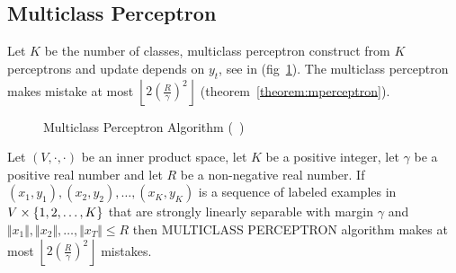 \subsection{Multiclass Perceptron}
Let $K$ be the number of classes, multiclass perceptron construct from $K$ perceptrons
and update depends on $y_t$, see in (fig~\ref{fig:alg-mperceptron}). 
The multiclass perceptron makes mistake at most $\left\lfloor 2\left( \frac{R}{\gamma} \right)^2\right\rfloor$ (theorem~\ref{theorem:mperceptron}).
\begin{figure}[hbt!]
  \begin{algorithm}[H]
    \SetAlgoLined
    \DontPrintSemicolon
  \end{algorithm}
  \caption{Multiclass Perceptron Algorithm (~\cite{CrammerS2003-ultraconservative})}
  \label{fig:alg-mperceptron}
\end{figure}

\begin{theorem}
\label{theorem:mperceptron}
Let $(V,\cdot,\cdot)$ be an inner product space, let $K$ be a
positive integer, let $\gamma$ be a positive real number and let $R$ be a non-negative real number. If $(x_1,y_1),(x_2,y_2),\dots,(x_K,y_K)$
is a sequence of labeled examples in $V\times\{1,2,\dots,K\}$ that are strongly linearly separable with margin $\gamma$ and
$\Vert x_1\Vert ,\Vert x_2\Vert ,\dots,\Vert x_T \Vert\leq R$ then MULTICLASS PERCEPTRON algorithm makes at most $\left\lfloor 2\left( \frac{R}{\gamma} \right)^2\right\rfloor$ mistakes.
\end{theorem}


